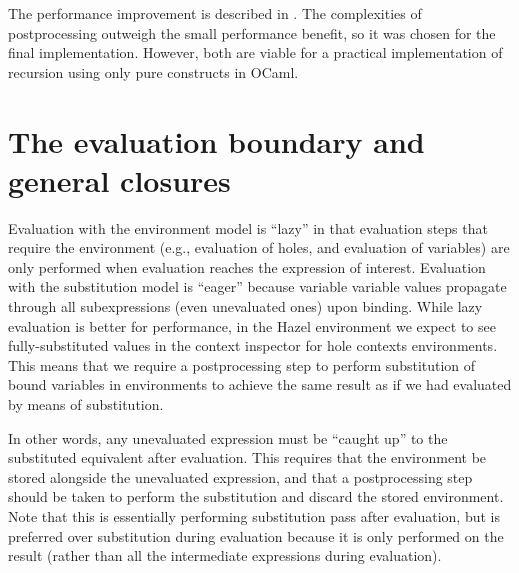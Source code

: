 The performance improvement is described in . The complexities of postprocessing outweigh the small performance benefit, so it was chosen for the final implementation. However, both are viable for a practical implementation of recursion using only pure constructs in OCaml.


\section{The evaluation boundary and general closures}
\label{sec:closures_to_lambdas}

Evaluation with the environment model is ``lazy'' in that evaluation steps that require the environment (e.g., evaluation of holes, and evaluation of variables) are only performed when evaluation reaches the expression of interest. Evaluation with the substitution model is ``eager'' because variable variable values propagate through all subexpressions (even unevaluated ones) upon binding. While lazy evaluation is better for performance, in the Hazel environment we expect to see fully-substituted values in the context inspector for hole contexts environments. This means that we require a postprocessing step to perform substitution of bound variables in environments to achieve the same result as if we had evaluated by means of substitution.

In other words, any unevaluated expression must be ``caught up'' to the substituted equivalent after evaluation. This requires that the environment be stored alongside the unevaluated expression, and that a postprocessing step should be taken to perform the substitution and discard the stored environment. Note that this is essentially performing substitution pass after evaluation, but is preferred over substitution during evaluation because it is only performed on the result (rather than all the intermediate expressions during evaluation).


